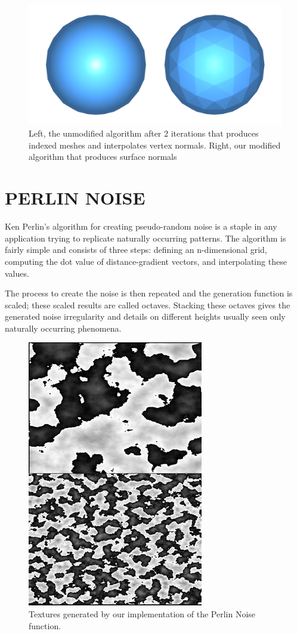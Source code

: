 \documentclass[a4paper,twoside]{article}
\begin{document}
\begin{figure}
\includegraphics[scale=0.24]{./images/icospheres/icospheresnormals.png}
\caption{Left, the unmodified algorithm after 2 iterations that produces indexed meshes and interpolates vertex normals. Right, our modified algorithm that produces surface normals}
\label{fig_isn}
\end{figure}

\section{\uppercase{Perlin Noise}}
\label{sec:pnoise}
\noindent Ken Perlin's algorithm for creating pseudo-random noise is a staple in any application trying to replicate naturally occurring patterns. The algorithm is fairly simple and consists of three steps: defining an n-dimensional grid, computing the dot value of distance-gradient vectors, and interpolating these values.

The process to create the noise is then repeated and the generation function is scaled; these scaled results are called octaves. Stacking these octaves gives the generated noise irregularity and details on different heights usually seen only naturally occurring phenomena.

\begin{figure}
\centering
\includegraphics[scale=0.5]{./images/perlin_noise/combined.png}
\caption{Textures generated by our implementation of the Perlin Noise function.}
\label{fig_pn}
\end{figure}
\end{document}
